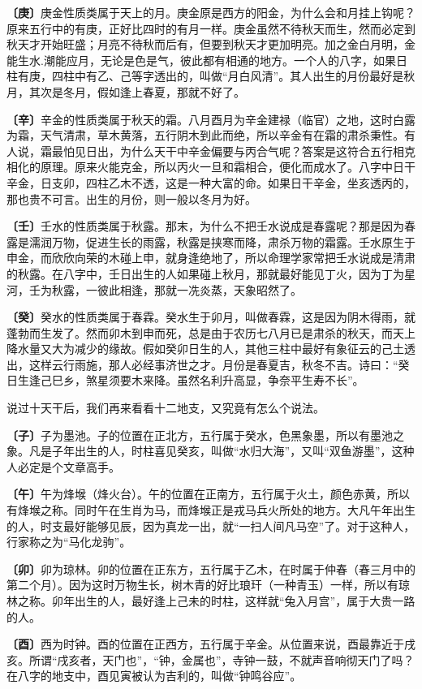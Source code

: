 \documentclass[a5paper,oneside,12pt]{ctexbook}
\begin{document}
\textbf{〔庚〕}庚金性质类属于天上的月。庚金原是西方的阳金，为什么会和月挂上钩呢？原来五行中的有庚，正好比四时的有月一样。庚金虽然不待秋天而生，然而必定到秋天才开始旺盛；月亮不待秋而后有，但要到秋天才更加明亮。加之金白月明，金能生水.潮能应月，无论是色是气，彼此都有相通的地方。一个人的八字，如果日柱有庚，四柱中有乙、己等字透出的，叫做“月白风清”。其人出生的月份最好是秋月，其次是冬月，假如逢上春夏，那就不好了。

\textbf{〔辛〕}辛金的性质类属于秋天的霜。八月酉月为辛金建禄（临官）之地，这时白露为霜，天气清肃，草木黄落，五行阴木到此而绝，所以辛金有在霜的肃杀秉性。有人说，霜最怕见日出，为什么天干中辛金偏要与丙合气呢？答案是这符合五行相克相化的原理。原来火能克金，所以丙火一旦和霜相合，便化而成水了。八字中日干辛金，日支卯，四柱乙木不透，这是一种大富的命。如果日干辛金，坐亥透丙的，那也贵不可言。出生的月份，则一般以冬月为好。

\textbf{〔壬〕}壬水的性质类属于秋露。那末，为什么不把壬水说成是春露呢？那是因为春露是濡润万物，促进生长的雨露，秋露是挟寒而降，肃杀万物的霜露。壬水原生于申金，而欣欣向荣的木碰上申，就身逢绝地了，所以命理学家常把壬水说成是清肃的秋露。在八字中，壬日出生的人如果碰上秋月，那就最好能见丁火，因为丁为星河，壬为秋露，一彼此相逢，那就一冼炎蒸，天象昭然了。

\textbf{〔癸〕}癸水的性质类属于春霖。癸水生于卯月，叫做春霖，这是因为阴木得雨，就蓬勃而生发了。然而卯木到申而死，总是由于农历七八月已是肃杀的秋天，而天上降水量又大为减少的缘故。假如癸卯日生的人，其他三柱中最好有象征云的己土透出，这样云行雨施，那人必经事济世之才。月份是春夏吉，秋冬不吉。诗曰：“癸日生逢己巳乡，煞星须要木来降。虽然名利升高显，争奈平生寿不长”。

说过十天干后，我们再来看看十二地支，又究竟有怎么个说法。

\textbf{〔子〕}子为墨池。子的位置在正北方，五行属于癸水，色黑象墨，所以有墨池之象。凡是子年出生的人，时柱喜见癸亥，叫做“水归大海”，又叫“双鱼游墨”，这种人必定是个文章高手。

\textbf{〔午〕}午为烽堠（烽火台）。午的位置在正南方，五行属于火土，颜色赤黄，所以有烽堠之称。同时午在生肖为马，而烽堠正是戎马兵火所处的地方。大凡午年出生的人，时支最好能够见辰，因为真龙一出，就“一扫人间凡马空”了。对于这种人，行家称之为“马化龙驹”。

\textbf{〔卯〕}卯为琼林。卯的位置在正东方，五行属于乙木，在时属于仲春（春三月中的第二个月）。因为这时万物生长，树木青的好比琅玕（一种青玉）一样，所以有琼林之称。卯年出生的人，最好逢上己未的时柱，这样就“兔入月宫”，属于大贵一路的人。	

\textbf{〔酉〕}西为时钟。酉的位置在正西方，五行属于辛金。从位置来说，酉最靠近于戌亥。所谓“戌亥者，天门也”，“钟，金属也”，寺钟一鼓，不就声音响彻天门了吗？在八字的地支中，酉见寅被认为吉利的，叫做“钟鸣谷应”。
\end{document}

